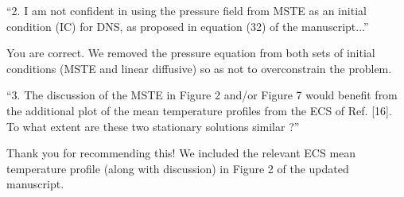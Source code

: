 \documentclass{article}
\begin{document}
``2. I am not confident in using the pressure field from MSTE as an initial condition (IC) for DNS, as proposed in equation (32) of the manuscript...''

\vspace{0.4cm}
You are correct. We removed the pressure equation from both sets of initial conditions (MSTE and linear diffusive) so as not to overconstrain the problem.
\vspace{0.4cm}

``3. The discussion of the MSTE in Figure 2 and/or Figure 7 would benefit from the additional plot of the mean temperature profiles from the ECS of Ref. [16]. To what extent are these two stationary solutions similar ?''

\vspace{0.4cm}
Thank you for recommending this! We included the relevant ECS mean temperature profile (along with discussion) in Figure 2 of the updated manuscript.
\end{document}
